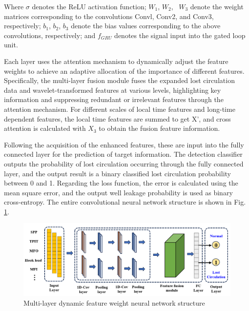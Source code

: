 \documentclass[journal,article,submit,pdftex,moreauthors]{Definitions/mdpi}
\begin{document}
Where $\sigma$ denotes the ReLU activation function; \({{W}_{1}}\), \({{W}_{2}}\),  \({{W}_{3}}\) denote the weight matrices corresponding to the convolutions Convl, Conv2, and Conv3, respectively; \({{b}_{1}}\), \({{b}_{2}}\), \({{b}_{3}}\) denote the bias values corresponding to the above convolutions, respectively; and \({{f}_{GRU}}\) denotes the signal input into the gated loop unit.

Each layer uses the attention mechanism to dynamically adjust the feature weights to achieve an adaptive allocation of the importance of different features. Specifically, the multi-layer fusion module fuses the expanded lost circulation data and wavelet-transformed features at various levels, highlighting key information and suppressing redundant or irrelevant features through the attention mechanism.
For different scales of local time features and long-time dependent features, the local time features are summed to get X', and cross attention is calculated with \({{X}_{3}}\) to obtain the fusion feature information.



Following the acquisition of the enhanced features, these are input into the fully connected layer for the prediction of target information. The detection classifier outputs the probability of lost circulation occurring through the fully connected layer, and the output result is a binary classified lost circulation probability between 0 and 1. Regarding the loss function, the error is calculated using the mean square error, and the output well leakage probability is used as binary cross-entropy. The entire convolutional neural network structure is shown in Fig. \ref{fig:Multi-layer dynamic feature weight neural network structure}.

\begin{figure}[H]
    \centering
    \includegraphics[width=0.95\linewidth]{图片/多尺度融合网络.png}
    \caption{Multi-layer dynamic feature weight neural network structure}
    \label{fig:Multi-layer dynamic feature weight neural network structure}
\end{figure}
\end{document}
